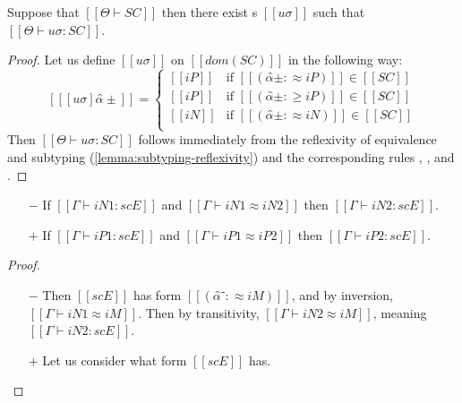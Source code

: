 \begin{lemma}
    \label{lemma:constraint-sat}
    Suppose that $[[Θ ⊢ SC]]$ then there exist
    s $[[uσ]]$ such that $[[Θ ⊢ uσ : SC]]$.
\end{lemma}
\begin{proof}
    Let us define $[[uσ]]$
    on $[[dom(SC)]]$ in the following way: 
    $$
    [[ [uσ]α̂± ]] = 
    \begin{cases}
        [[iP]] & \text{if $[[(α̂± :≈ iP)]] \in [[SC]]$} \\
        [[iP]] & \text{if $[[(α̂± :≥ iP)]] \in [[SC]]$} \\
        [[iN]] & \text{if $[[(α̂± :≈ iN)]] \in [[SC]]$} \\
    \end{cases}
    $$
    Then $[[Θ ⊢ uσ : SC]]$ follows immediately
    from the reflexivity of equivalence and subtyping
    (\cref{lemma:subtyping-reflexivity}) and the corresponding
    rules 
    , 
    ,
    and .
\end{proof}


\begin{lemma}
    \label{lemma:entry-sat-equiv}
    \begin{itemize}
        \item [$-$] If $[[Γ ⊢ iN1 : scE]]$ and $[[Γ ⊢ iN1 ≈ iN2]]$ then $[[Γ ⊢ iN2 : scE]]$.
        \item [$+$] If $[[Γ ⊢ iP1 : scE]]$ and $[[Γ ⊢ iP1 ≈ iP2]]$ then $[[Γ ⊢ iP2 : scE]]$.
    \end{itemize}
\end{lemma}
\begin{proof}
    \begin{itemize}
        \item [$-$] Then $[[scE]]$ has form $[[(α̂⁻ :≈ iM)]]$, 
            and by inversion, $[[Γ ⊢ iN1 ≈ iM]]$.
            Then by transitivity, $[[Γ ⊢ iN2 ≈ iM]]$, 
            meaning $[[Γ ⊢ iN2 : scE]]$.
        \item [$+$] Let us consider what form $[[scE]]$ has.
    \end{itemize}
\end{proof}

